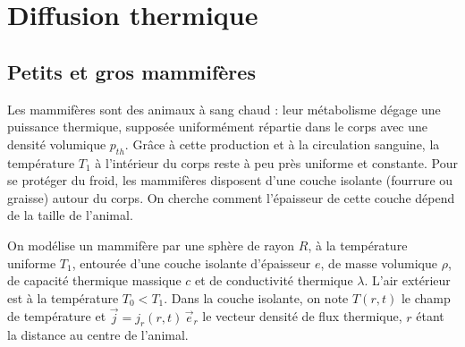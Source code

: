\chapter{Diffusion thermique}

\newpage

\section{Petits et gros mammifères}

Les mammifères sont des animaux à sang chaud : leur métabolisme dégage une puissance thermique, supposée uniformément répartie dans le corps avec une densité volumique $p_{th}$. Grâce à cette production et à la circulation sanguine, la température $T_1$ à l'intérieur du corps reste à peu près uniforme et constante. Pour se protéger du froid, les mammifères disposent d'une couche isolante (fourrure ou graisse) autour du corps. On cherche comment l'épaisseur de cette couche dépend de la taille de l'animal.

On modélise un mammifère par une sphère de rayon $R$, à la température uniforme $T_1$, entourée d'une couche isolante d'épaisseur $e$, de masse volumique $\rho$, de capacité thermique massique $c$ et de conductivité thermique $\lambda$. L'air extérieur est à la température $T_0<T_1$. Dans la couche isolante, on note $T(r,t)$ le champ de température et $\vec{j}=j_r(r,t)\,\vec{e}_r$ le vecteur densité de flux thermique, $r$ étant la distance au centre de l'animal.

